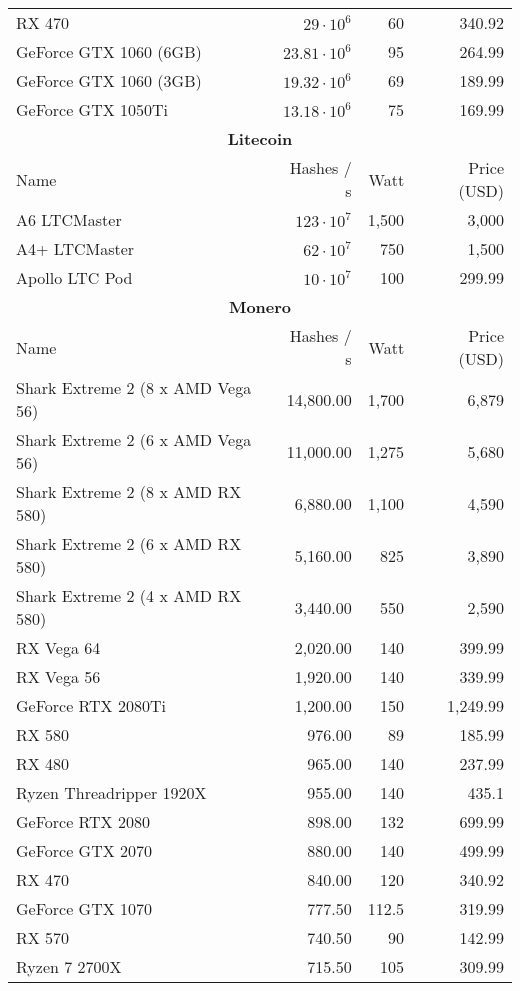 \begin{longtable}{|p{}|r|r|r|}
  RX 470 & $29 \cdot 10^{6}$ & 60 & 340.92 \\
  GeForce GTX 1060 (6GB) & $23.81 \cdot 10^{6}$ & 95 & 264.99 \\
  GeForce GTX 1060 (3GB) & $19.32 \cdot 10^{6}$ & 69 & 189.99 \\
  GeForce GTX 1050Ti & $13.18 \cdot 10^{6}$ & 75 & 169.99 \\
  \hline
  \multicolumn{4}{|c|}{\textbf{Litecoin}} \\
  \hline
  Name & Hashes / s & Watt & Price (USD) \\
  \hhline{|=|=|=|=|}
  A6 LTCMaster & $123 \cdot 10^{7}$ & 1,500 & 3,000 \\
  A4+ LTCMaster & $62 \cdot 10^{7}$ & 750 & 1,500 \\
  Apollo LTC Pod & $10 \cdot 10^{7}$ & 100 & 299.99 \\
  \hline
  \hline
  \multicolumn{4}{|c|}{\textbf{Monero}} \\
  \hline
  Name & Hashes / s & Watt & Price (USD) \\
  \hhline{|=|=|=|=|}
  Shark Extreme 2 (8 x AMD Vega 56) & 14,800.00 & 1,700 & 6,879 \\
  Shark Extreme 2 (6 x AMD Vega 56) & 11,000.00 & 1,275 & 5,680 \\
  Shark Extreme 2 (8 x AMD RX 580) & 6,880.00 & 1,100 & 4,590 \\
  Shark Extreme 2 (6 x AMD RX 580) & 5,160.00 & 825 & 3,890 \\
  Shark Extreme 2 (4 x AMD RX 580) & 3,440.00 & 550 & 2,590 \\
  RX Vega 64 & 2,020.00 & 140 & 399.99 \\
  RX Vega 56 & 1,920.00 & 140 & 339.99 \\
  GeForce RTX 2080Ti & 1,200.00 & 150 & 1,249.99 \\
  RX 580 & 976.00 & 89 & 185.99 \\
  RX 480 & 965.00 & 140 & 237.99 \\
  Ryzen Threadripper 1920X & 955.00 & 140 & 435.1 \\
  GeForce RTX 2080 & 898.00 & 132 & 699.99 \\
  GeForce GTX 2070 & 880.00 & 140 & 499.99 \\
  RX 470 & 840.00 & 120 & 340.92 \\
  GeForce GTX 1070 & 777.50 & 112.5 & 319.99 \\
  RX 570 & 740.50 & 90 & 142.99 \\
  Ryzen 7 2700X & 715.50 & 105 & 309.99 \\

\end{longtable}
